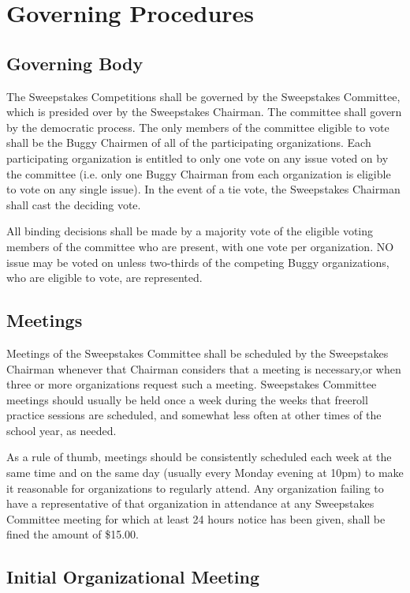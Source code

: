 \documentclass[openany]{book}
\begin{document}
\section{Governing Procedures}

\subsection{Governing Body}

The Sweepstakes Competitions shall be governed by the Sweepstakes Committee, which is presided over by the Sweepstakes Chairman. The committee shall govern by the democratic process. The only members of the committee eligible to vote shall be the Buggy Chairmen of all of the participating organizations. Each participating organization is entitled to only one vote on any issue voted on by the committee (i.e. only one Buggy Chairman from each organization is eligible to vote on any single issue). In the event of a tie vote, the Sweepstakes Chairman shall cast the deciding vote.

All binding decisions shall be made by a majority vote of the eligible voting members of the committee who are present, with one vote per organization. NO issue may be voted on unless two-thirds of the competing Buggy organizations, who are eligible to vote, are represented.

\subsection{Meetings}

Meetings of the Sweepstakes Committee shall be scheduled by the Sweepstakes Chairman whenever that Chairman considers that a meeting is necessary,or when three or more organizations request such a meeting. Sweepstakes Committee meetings should usually be held once a week during the weeks that freeroll practice sessions are scheduled, and somewhat less often at other times of the school year, as needed.

As a rule of thumb, meetings should be consistently scheduled each week at the same time and on the same day (usually every Monday evening at 10pm) to make it reasonable for organizations to regularly attend. Any organization failing to have a representative of that organization in attendance at any Sweepstakes Committee meeting for which at least 24 hours notice has been given, shall be fined the amount of \$15.00.

\subsection{Initial Organizational Meeting}
\end{document}

